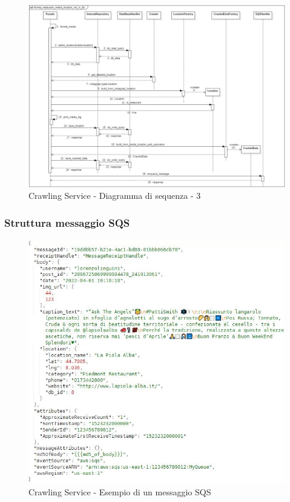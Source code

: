 \begin{figure}[!htp]
    \centering
    \includegraphics[scale=0.45]{Contenuto/Immagini/seq3-CS.JPG}
    \caption{Crawling Service - Diagramma di sequenza - 3}
\end{figure}

\subsubsection{Struttura messaggio SQS}
\begin{figure}[H]
    \centerfloat
    \includegraphics[scale=0.55]{Contenuto/Immagini/messaggiosqs.JPG}
    \caption{Crawling Service - Esempio di un messaggio SQS}
\end{figure}

